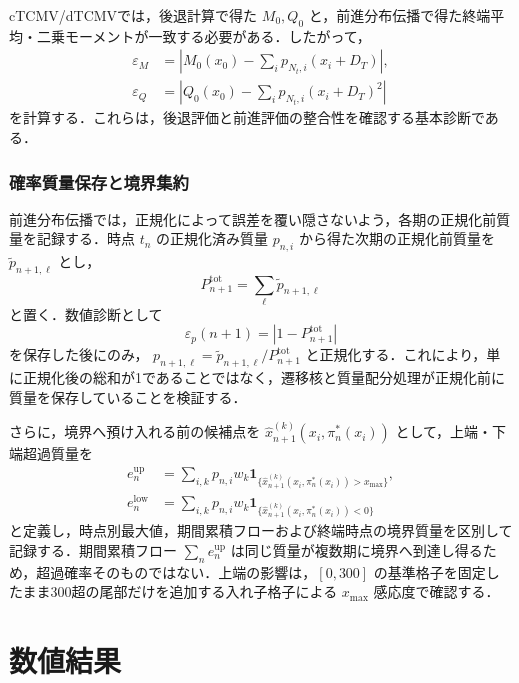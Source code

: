 \documentclass[10pt,a4paper]{article}
\theoremstyle{plain}
\theoremstyle{definition}
\newcommand{\one}{\mathbf{1}}
\begin{document}
cTCMV/dTCMVでは，後退計算で得た $M_0,Q_0$ と，前進分布伝播で得た終端平均・二乗モーメントが一致する必要がある．したがって，
\begin{align}
  \varepsilon_M&=
  \left|M_0(x_0)-\sum_i p_{N_t,i}(x_i+D_T)\right|,
  \label{eq:eps-M}\\
  \varepsilon_Q&=
  \left|Q_0(x_0)-\sum_i p_{N_t,i}(x_i+D_T)^2\right|
  \label{eq:eps-Q}
\end{align}
を計算する．これらは，後退評価と前進評価の整合性を確認する基本診断である．

\subsubsection{確率質量保存と境界集約}

前進分布伝播では，正規化によって誤差を覆い隠さないよう，各期の正規化前質量を記録する．時点 $t_n$ の正規化済み質量 $p_{n,i}$ から得た次期の正規化前質量を $\widetilde p_{n+1,\ell}$ とし，
\begin{equation}
  P_{n+1}^{\mathrm{tot}}=\sum_{\ell}\widetilde p_{n+1,\ell}
  \label{eq:mass-total}
\end{equation}
と置く．数値診断として
\begin{equation}
  \varepsilon_p(n+1)=\left|1-P_{n+1}^{\mathrm{tot}}\right|
  \label{eq:mass-error}
\end{equation}
を保存した後にのみ， $p_{n+1,\ell}=\widetilde p_{n+1,\ell}/P_{n+1}^{\mathrm{tot}}$ と正規化する．これにより，単に正規化後の総和が1であることではなく，遷移核と質量配分処理が正規化前に質量を保存していることを検証する．

さらに，境界へ預け入れる前の候補点を $\widehat{x}_{n+1}^{(k)}(x_i,\pi_n^*(x_i))$ として，上端・下端超過質量を
\begin{align}
  e_n^{\mathrm{up}}
  &=\sum_{i,k}p_{n,i}w_k\one_{\{\widehat{x}_{n+1}^{(k)}(x_i,\pi_n^*(x_i))>x_{\max}\}},\\
  e_n^{\mathrm{low}}
  &=\sum_{i,k}p_{n,i}w_k\one_{\{\widehat{x}_{n+1}^{(k)}(x_i,\pi_n^*(x_i))<0\}}
  \label{eq:boundary-excursion}
\end{align}
と定義し，時点別最大値，期間累積フローおよび終端時点の境界質量を区別して記録する．期間累積フロー $\sum_n e_n^{\mathrm{up}}$ は同じ質量が複数期に境界へ到達し得るため，超過確率そのものではない．上端の影響は，$[0,300]$ の基準格子を固定したまま300超の尾部だけを追加する入れ子格子による $x_{\max}$ 感応度で確認する．

\section{数値結果}\label{sec:numerical-results}
\label{sec:all-strategy-numerics}
\end{document}

